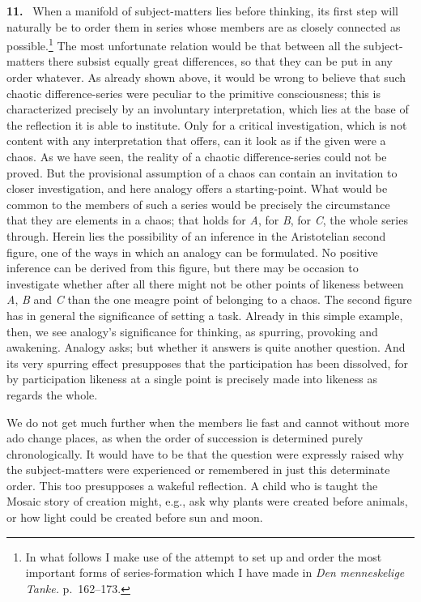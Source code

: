 \documentclass[12pt]{book}
\newcommand{\hnum}[1]{\noindent\textbf{#1.}~}
\newcommand{\opage}[1]{\marginnote{\footnotesize\textit{[#1]}}}
\begin{document}
\hnum{11} When a manifold of subject-matters lies before thinking, its first step
will naturally be to order them in series whose members are as closely connected
as possible.\footnote{In what follows I make use of the attempt to set up and
order the most important forms of series-formation which I have made in
\textit{Den menneskelige Tanke.} p.\ 162--173.} \opage{56}The most unfortunate relation
would be that between all the subject-matters there subsist equally great
differences, so that they can be put in any order whatever. As already shown
above, it would be wrong to believe that such chaotic difference-series were
peculiar to the primitive consciousness; this is characterized precisely by an
involuntary interpretation, which lies at the base of the reflection it is able
to institute. Only for a critical investigation, which is not content with any
interpretation that offers, can it look as if the given were a chaos. As we have
seen, the reality of a chaotic difference-series could not be proved. But the
provisional assumption of a chaos can contain an invitation to closer
investigation, and here analogy offers a starting-point. What would be common to
the members of such a series would be precisely the circumstance that they are
elements in a chaos; that holds for \textit{A}, for \textit{B}, for \textit{C},
the whole series through. Herein lies the possibility of an inference in the
Aristotelian second figure, one of the ways in which an analogy can be
formulated. No positive inference can be derived from this figure, but there may
be occasion to investigate whether after all there might not be other points of
likeness between \textit{A}, \textit{B} and \textit{C} than the one meagre point
of belonging to a chaos. The second figure has in general the significance of
setting a task. Already in this simple example, then, we see analogy's
significance for thinking, as spurring, provoking and awakening. Analogy asks;
but whether it answers is quite another question. And its very spurring effect
presupposes that the participation has been dissolved, for by participation
likeness at a single point is precisely made into likeness as regards the whole.

We do not get much further when the members lie fast and \opage{57}cannot without more ado
change places, as when the order of succession is determined purely
chronologically. It would have to be that the question were expressly raised why
the subject-matters were experienced or remembered in just this determinate
order. This too presupposes a wakeful reflection. A child who is taught the
Mosaic story of creation might, e.g., ask why plants were created before animals,
or how light could be created before sun and moon.
\end{document}

